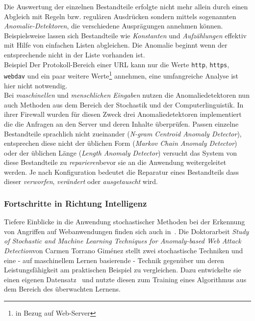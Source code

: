 Die Auswertung der einzelnen Bestandteile erfolgte nicht mehr allein durch einen Abgleich mit Regeln bzw. regulären Ausdrücken sondern mittels sogenannten \emph{Anomalie-Detektoren}, die verschiedene Ausprägungen annehmen können. Beispielsweise lassen sich Bestandteile wie \emph{Konstanten} und \emph{Aufzählungen} effektiv mit Hilfe von einfachen Listen abgleichen. Die Anomalie beginnt wenn der entsprechende nicht in der Liste vorhanden ist.\\

\textcolor{bhtGray}{ Beispiel} Der Protokoll-Bereich einer URL kann nur die Werte \verb=http=, \verb=https=, \verb=webdav= und ein paar weitere Werte\footnote{in Bezug auf Web-Server} annehmen, eine umfangreiche Analyse ist hier nicht notwendig. \\

Bei \emph{maschinellen} und \emph{menschlichen Eingaben} nutzen die Anomaliedetektoren nun auch Methoden aus dem Bereich der Stochastik und der Computerlinguistik. In ihrer Firewall wurden für diesen Zweck drei Anomaliedetektoren implementiert die die Anfragen an den Server und deren Inhalte überprüfen. Passen einzelne Bestandteile sprachlich nicht zueinander (\emph{N-gram Centroid Anomaly Detector}), entsprechen diese nicht der üblichen Form (\emph{Markov Chain Anomaly Detector}) oder der üblichen Länge (\emph{Length Anomaly Detector}) versucht das System von~\cite{Krueger2010} diese Bestandteile zu \glqq\emph{reparieren}\grqq bevor sie an die Anwendung weitergeleitet werden. Je nach Konfiguration bedeutet die Reparatur eines Bestandteils dass dieser \emph{verworfen}, \emph{verändert} oder \emph{ausgetauscht} wird. 






\subsubsection{Fortschritte in Richtung Intelligenz}

Tiefere Einblicke in die Anwendung stochastischer Methoden bei der Erkennung von Angriffen auf Webanwendungen finden sich auch in~\cite{Giménez2015}. Die Doktorarbeit \glqq\emph{Study of Stochastic and Machine Learning Techniques for Anomaly-based Web Attack Detection}\grqq von Carmen Torrano Giménez stellt zwei stochastische Techniken und eine - auf maschinellem Lernen basierende - Technik gegenüber um deren Leistungsfähigkeit am praktischen Beispiel zu vergleichen. Dazu entwickelte sie einen eigenen Datensatz~\cite{csic2010} und nutzte diesen zum Training eines Algorithmus aus dem Bereich des überwachten Lernens.\\

